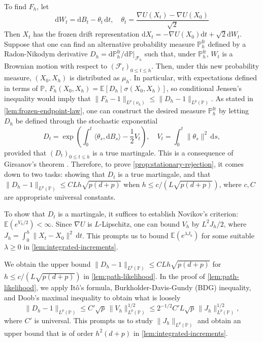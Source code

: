 \documentclass[11pt]{article}
\newcommand{\1}{\mathbf 1}
\newcommand{\df}{\mathrm{d}}
\begin{document}
	To find $F_h$, let 
	\[
	\df W_t = \df B_t - \theta_t \, \df t, \quad \theta_t = \frac{\nabla U(X_t) - \nabla U(X_0)}{\sqrt{2}}
	\]
	Then $X_t$ has the frozen drift representation $\df X_t = - \nabla U(X_0) \df t + \sqrt{2} \df W_t$.
	Suppose that one can find an alternative probability measure $\mathbb P_h^{\mathrm{fr}}$ defined by a Radon-Nikodym derivative $D_h = \df \mathbb P_h^{\mathrm{fr}}/\df \mathbb P|_{\mathcal{F}_h}$ such that, under $\mathbb P_h^{\mathrm{fr}}$, $W_t$ is a Brownian motion with respect to $(\mathcal{F}_t)_{0 \leq t \leq h}$.
	Then, under this new probability measure, $(X_0, X_h)$ is distributed as $\mu_h$.
	In particular, with expectations defined in terms of $\mathbb{P}$, $F_h(X_0, X_h) = \mathbb{E}[D_h \mid \sigma(X_0, X_h)]$, so conditional Jensen's inequality would imply that $\|F_h - 1\|_{L^p(\nu_h)} \leq \|D_h - 1\|_{L^p(\mathbb{P})}$.
	As stated in \cref{lem:frozen-endpoint-law}, one can construct the desired measure $\mathbb{P}_h^{\mathrm{fr}}$ by letting $D_h$ be defined through the stochastic exponential
	\[
	D_t = \exp\left( \int_0^t \langle \theta_s, \df B_s \rangle - \frac{1}{2} V_t \right), \quad V_t = \int_0^t \|\theta_s\|^2 \, \df s,
	\]
	provided that $(D_t)_{0 \leq t \leq h}$ is a true martingale.
	This is a consequence of  Girsanov's theorem \citep[see, e.g.,][]{KaratzasShreve1991,RevuzYor1999}.
	Therefore, to prove \cref{prop:stationary-rejection}, it comes down to two tasks: showing that $D_t$ is a true martingale, and that $\|D_h - 1\|_{L^p(\mathbb{P})} \leq C L h \sqrt{p(d+p)}$ when $h \leq c/(L\sqrt{p(d+p)})$, where $c, C$ are appropriate universal constants.
	
	To show that $D_t$ is a martingale, it suffices to establish Novikov's criterion: $\mathbb{E} (e^{V_h/2}) < \infty$.
	Since $\nabla U$ is $L$-Lipschitz, one can bound $V_h$ by $L^2 J_h/2$, where $J_h = \int_0^h \|X_t - X_0\|^2 \, \df t$.
	This prompts us to bound $\mathbb{E}(e^{\lambda J_h})$ for some suitable $\lambda \geq 0$ in \cref{lem:integrated-increments}.
	
	We obtain the upper bound $\|D_h - 1\|_{L^p(\mathbb{P})} \leq C L h \sqrt{p(d+p)}$ for $h \leq c/(L\sqrt{p(d+p)})$ in \cref{lem:path-likelihood}.
	In the proof of \cref{lem:path-likelihood}, we apply It\^o's formula, Burkholder-Davis-Gundy (BDG) inequality, and Doob's maximal inequality to obtain what is loosely
	\[
	\|D_h - 1\|_{L^p(\mathbb{P})} \leq C' \sqrt{p} \, \|V_h\|_{L^p(\mathbb{P})}^{1/2} \leq 2^{-1/2} C' L \sqrt{p} \, \|J_h\|_{L^p(\mathbb{P})}^{1/2},
	\]
	where $C'$ is universal.
	This prompts us to study $\|J_h\|_{L^p(\mathbb{P})}$ and obtain an upper bound that is of order $h^2(d+p)$ in \cref{lem:integrated-increments}.
	
\end{document}
